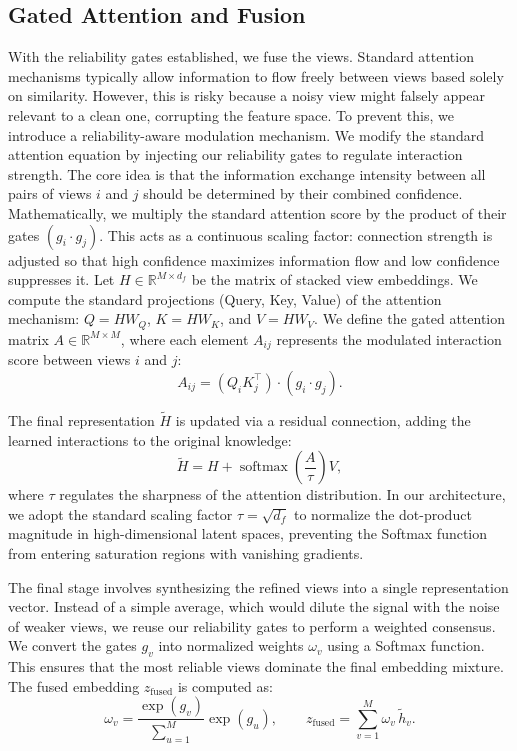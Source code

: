 \documentclass[journal]{IEEEtran}
\begin{document}
\subsection{Gated Attention and Fusion}

With the reliability gates established, we fuse the views. Standard attention mechanisms typically allow information to flow freely between views based solely on similarity. However, this is risky because a noisy view might falsely appear relevant to a clean one, corrupting the feature space. To prevent this, we introduce a reliability-aware modulation mechanism. We modify the standard attention equation by injecting our reliability gates to regulate interaction strength. The core idea is that the information exchange intensity between all pairs of views $i$ and $j$ should be determined by their combined confidence. Mathematically, we multiply the standard attention score by the product of their gates $(g_i \cdot g_j)$. This acts as a continuous scaling factor: connection strength is adjusted so that high confidence maximizes information flow and low confidence suppresses it. Let $H \in \mathbb{R}^{M \times d_f}$ be the matrix of stacked view embeddings. We compute the standard projections (Query, Key, Value) of the attention mechanism: $Q = HW_Q$, $K = HW_K$, and $V = HW_V$. We define the gated attention matrix $A \in \mathbb{R}^{M \times M}$, where each element $A_{ij}$ represents the modulated interaction score between views $i$ and $j$:
\begin{equation}
A_{ij} = (Q_i K_j^\top) \cdot (g_i \cdot g_j).
\end{equation}


The final representation $\widetilde{H}$ is updated via a residual connection, adding the learned interactions to the original knowledge:
\begin{equation}
\widetilde{H} = H + \operatorname{softmax}\left(\frac{A}{\tau}\right)V,
\end{equation}
where $\tau$ regulates the sharpness of the attention distribution. In our architecture, we adopt the standard scaling factor $\tau = \sqrt{d_f}$ \cite{vaswani2017attention} to normalize the dot-product magnitude in high-dimensional latent spaces, preventing the Softmax function from entering saturation regions with vanishing gradients.

The final stage involves synthesizing the refined views into a single representation vector. Instead of a simple average, which would dilute the signal with the noise of weaker views, we reuse our reliability gates to perform a weighted consensus. We convert the gates $g_v$ into normalized weights $\omega_v$ using a Softmax function. This ensures that the most reliable views dominate the final embedding mixture. The fused embedding $z_{\text{fused}}$ is computed as:
\begin{equation}
\omega_v = \frac{\exp(g_v)}{\sum_{u = 1}^{M}} \exp(g_u), \qquad z_{\text{fused}} = \sum_{v=1}^{M} \omega_v \,\widetilde{h}_v.
\end{equation}
\end{document}
